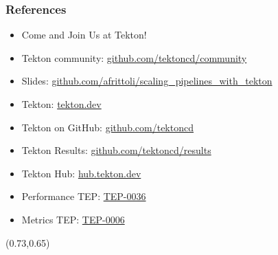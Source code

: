 \documentclass[aspectratio=169,11pt,hyperref={colorlinks=true}]{beamer}
\begin{document}
\begin{blackframe}
  \frametitle{References}
  \begin{itemize}
    \item \large Come and Join Us at Tekton!
    \item \normalsize Tekton community: \href{https://github.com/tektoncd/community}{github.com/tektoncd/community} \\
  \end{itemize}
  \begin{itemize}
    \item Slides: \href{https://github.com/afrittoli/scaling_pipelines_with_tekton/blob/scd2021/scaling_pipelines_with_tekton.pdf}{github.com/afrittoli/scaling\_pipelines\_with\_tekton}
    \item Tekton: \href{https://tekton.dev}{tekton.dev}
    \item Tekton on GitHub: \href{https://github.com/tektoncd}{github.com/tektoncd}
    \item Tekton Results: \href{https://github.com/tektoncd/results}{github.com/tektoncd/results}
    \item Tekton Hub: \href{https://hub.tekton.dev}{hub.tekton.dev}
    \item Performance TEP: \href{https://github.com/tektoncd/community/blob/master/teps/0036-start-measuring-tekton-pipelines-performance.md}{TEP-0036}
    \item Metrics TEP: \href{https://github.com/tektoncd/community/blob/master/teps/0006-tekton-metrics.md}{TEP-0006}
  \end{itemize}
  \begin{textblock*}{0.13\paperwidth}(0.73\paperwidth,0.65\paperheight)
    
  \end{textblock*}
\end{blackframe}
\end{document}
